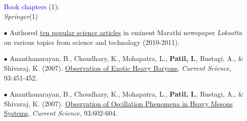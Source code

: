 \documentclass[10pt]{article}
\begin{document}
	\textcolor{blue}{\hspace*{0.1in}Book chapters} (1):\\
	\hspace*{0.1in}\textit{Springer}(1)
	
	
	$\bullet$ Authored \href{https://drive.google.com/file/d/0B6_u70YpdJKnUUdoM2sydFRuTmNLaURUQ1FxaE9uTS1oVFRF/view?usp=sharing}{ten popular science articles} in eminent Marathi newspaper \textit{Loksatta} on various topics from science \hspace*{0.1in}and technology (2010-2011). 
	\miniskip
	
	$\bullet$ Ananthanarayan, B., Choudhary, K., Mohapatra, L., \textbf{Patil, I.}, Rustagi, A., \& Shivaraj, K. (2007). \hspace*{0.1in}\href{http://eprints.iisc.ernet.in/26860/1/current.pdf}{Observation of Exotic Heavy Baryons}, \textit{Current Science}, 93:451-452.
	\miniskip
	
	$\bullet$ Ananthanarayan, B., Choudhary, K., Mohapatra, L., \textbf{Patil, I.}, Rustagi, A., \& Shivaraj, K. (2007). \hspace*{0.1in}\href{http://eprints.iisc.ernet.in/15428/1/Observation_of_oscillation.pdf}{Observation of Oscillation Phenomena in Heavy Mesons Systems}, \textit{Current Science}, 93:602-604.
	\miniskip
	
	
	
\end{document}

